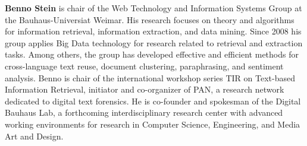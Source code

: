 \begin{bio}
{\bfseries Benno Stein} is chair of the Web Technology and Information Systems Group at the Bauhaus-Universiat Weimar. His research focuses on theory and algorithms for information retrieval, information extraction, and data mining. Since 2008 his group applies Big Data technology for research related to retrieval and extraction tasks. Among others, the group has developed effective and efficient methods for cross-language text reuse, document clustering, paraphrasing, and sentiment analysis. Benno is chair of the international workshop series TIR on Text-based Information Retrieval, initiator and co-organizer of PAN, a research network dedicated to digital text forensics. He is co-founder and spokesman of the Digital Bauhaus Lab, a forthcoming interdisciplinary research center with advanced working environments for research in Computer Science, Engineering, and Media Art and Design.  
\end{bio}

